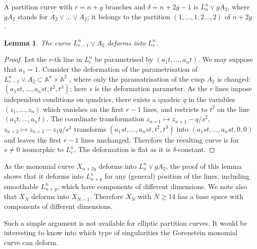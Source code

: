 \documentclass[12pt,a4paper]{amsart}  %
\newcommand{\A}{\mathbb{A}}
\newtheorem{lemma}[thm]{Lemma}
\theoremstyle{definition}
\theoremstyle{remark}
\begin{document}
A partition curve with $r=n+g$ branches and $\delta= n+2g-1$ is
$L_n^n\vee gA_2$, where $gA_2$ stands for $A_2\vee \dots\vee A_2$;
it belongs to the partition $(1,\dots,1,2\dots,2)$ of $n+2g$.


\begin{lemma}
The curve $L_{r-1}^n\vee A_2$ deforms into $L_r^n$.
\end{lemma}

\begin{proof}
Let the $r$-th line in $L_r^n$ be  parametrised by
$(a_1t,\dots,a_nt)$. We may suppose that $a_1= 1$. 
Consider the deformation of the parametrisation of 
$L_{r-1}^n\vee A_2\subset \A^n\times \A^2$ , 
where only the paramatrisation of the cusp $A_2$ is
changed: 
$(a_1st,\dots,a_nst,t^2,t^3)$; here $s$ is the deformation parameter. 
As the $r$ lines impose independent conditions
on quadrics, there exists a quadric $q$ in the variables $(z_1,\dots,z_n)$ which vanishes
on the first $r-1$ lines, and restricts to $t^2$ on the line $(a_1t,\dots,a_nt)$.
The coordinate transformation $z_{n+1}\mapsto z_{n+1}-q/s^2$, 
$z_{n+2}\mapsto z_{n+2}-z_1q/s^3$ transforms $(a_1st,\dots,a_nst,t^2,t^3)$
into $(a_1st,\dots,a_nst,0,0)$ and leaves the first $r-1$ lines unchanged. Therefore
the resulting curve is for $s\neq 0$
isomorphic to $L_r^n$.
The deformation is flat as it is $\delta$-constant.
\end{proof}

As the monomial curve $X_{n+2g}$ deforms into $L_n^n\vee gA_2$, the proof of this lemma
shows that it  deforms into $L_{n+g}^n$ for any (general) position of the lines,
including smoothable  $L_{n+g}^n$, which have components of different dimensions.
We note also that $X_{N}$ deforms into $X_{N-1}$. Therefore $X_N$ with 
$N\geq 14$ has a base space with components  of different dimensions.


Such a simple argument is not available for elliptic partition curves. It would be interesting
to know into which type of singularities the Gorenstein monomial curve can deform.
 
 
 
\end{document}
